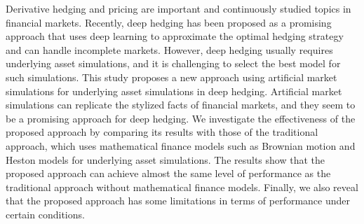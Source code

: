 Derivative hedging and pricing are important and continuously studied topics in financial markets.
    Recently, deep hedging has been proposed as a promising approach that uses deep learning to approximate the optimal hedging strategy and can handle incomplete markets.
    However, deep hedging usually requires underlying asset simulations, and it is challenging to select the best model for such simulations.
    This study proposes a new approach using artificial market simulations for underlying asset simulations in deep hedging.
    Artificial market simulations can replicate the stylized facts of financial markets, and they seem to be a promising approach for deep hedging.
    We investigate the effectiveness of the proposed approach by comparing its results with those of the traditional approach, which uses mathematical finance models such as Brownian motion and Heston models for underlying asset simulations.
    The results show that the proposed approach can achieve almost the same level of performance as the traditional approach without mathematical finance models.
    Finally, we also reveal that the proposed approach has some limitations in terms of performance under certain conditions.